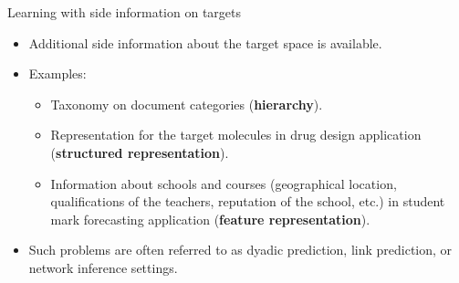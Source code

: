 \documentclass[]{beamer}
\renewcommand{\emph}[1]{\textbf{\color{putblue}#1}}
\begin{document}
\begin{frame}{Learning with side information on targets}
\begin{itemize}
\item Additional side information about the target space is available.
\item Examples: 
\begin{itemize}
\item Taxonomy on document categories (\emph{hierarchy}).
\item Representation for the target molecules in drug design application (\emph{structured representation}).
\item Information about schools and courses (geographical location, qualifications of the teachers, reputation of the school, etc.) in student mark forecasting application (\emph{feature representation}).
\end{itemize}
\item Such problems are often referred to as dyadic prediction, link prediction, or network inference settings.
\end{itemize}
\end{frame}
%
%
%
%
%
%
%
%
\end{document}
